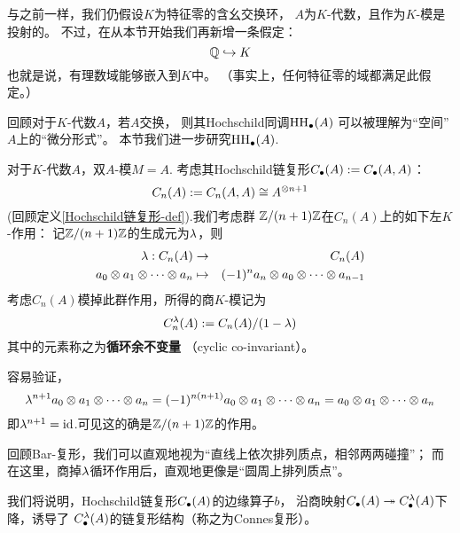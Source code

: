 与之前一样，我们仍假设$K$为特征零的含幺交换环，
$A$为$K$-代数，且作为$K$-模是投射的。
不过，在从本节开始我们再新增一条假定：
$$\mathbb{Q}\hookrightarrow K$$
也就是说，有理数域能够嵌入到$K$中。
（事实上，任何特征零的域都满足此假定。）

回顾对于$K$-代数$A$，若$A$交换，
则其Hochschild同调$\operatorname{HH}_{\bullet}(A)$
可以被理解为“空间”$A$上的“微分形式”。
本节我们进一步研究$\operatorname{HH}_{\bullet}(A)$.

\begin{notation}
对于$K$-代数$A$，双$A$-模$M=A$.
考虑其Hochschild链复形$C_{\bullet}(A):=C_{\bullet}(A,A)$：
$$C_n(A):=C_n(A,A)\cong A^{\otimes n+1}$$
(回顾定义\ref{Hochschild链复形-def}).我们考虑群
$\mathbb{Z}/(n+1)\mathbb{Z}$在$C_n(A)$上的如下左$K$-作用：
记$\mathbb{Z}/(n+1)\mathbb{Z}$的生成元为$\lambda$，则
\begin{eqnarray*}
\lambda:C_n(A)&\to&C_n(A)\\
a_0\otimes a_1\otimes\cdots\otimes a_n
&\mapsto&
(-1)^na_n\otimes a_0\otimes\cdots\otimes a_{n-1}
\end{eqnarray*}
考虑$C_n(A)$模掉此群作用，所得的商$K$-模记为
$$C^{\lambda}_n(A):=C_n(A)/(1-\lambda)$$
其中的元素称之为\textbf{循环余不变量}
（cyclic co-invariant）。
\end{notation}


容易验证，
$$\lambda^{n+1}a_0\otimes a_1\otimes\cdots\otimes a_n=
(-1)^{n(n+1)}a_0\otimes a_1\otimes\cdots\otimes a_n
=a_0\otimes a_1\otimes\cdots\otimes a_n$$
即$\lambda^{n+1}=\operatorname{id}$.可见这的确是$\mathbb{Z}/(n+1)\mathbb{Z}$的作用。

回顾Bar-复形，我们可以直观地视为“直线上依次排列质点，相邻两两碰撞”；
而在这里，商掉$\lambda$循环作用后，直观地更像是“圆周上排列质点”。

我们将说明，Hochschild链复形$C_{\bullet}(A)$的边缘算子$b$，
沿商映射$C_{\bullet}(A)\twoheadrightarrow C^{\lambda}_{\bullet}(A)$下降，诱导了
$C_{\bullet}^{\lambda}(A)$的链复形结构（称之为Connes复形）。


